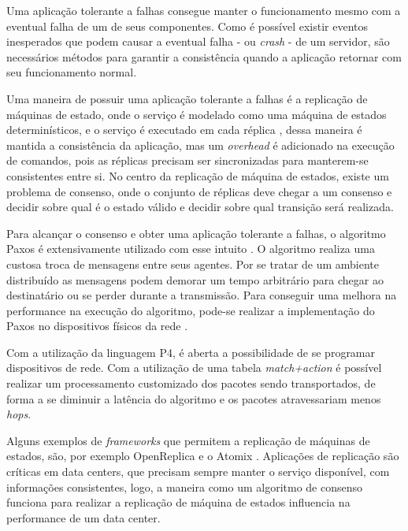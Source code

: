 \documentclass[
    12pt,
    openright, 
    oneside,
    a4paper,
    french,
    english,
    brazil
    ]{facom-ufu-abntex2}
\theoremstyle{definition}
\begin{document}
Uma aplicação tolerante a falhas consegue manter o funcionamento mesmo com a eventual 
falha de um de seus componentes. 
Como é possível existir eventos inesperados que podem causar a eventual falha - ou \emph{crash} - de um servidor, 
são necessários métodos para garantir a consistência quando a aplicação retornar com seu funcionamento normal. 

Uma maneira de possuir uma aplicação tolerante a falhas é a replicação de máquinas de estado, onde o serviço é modelado 
como uma máquina de estados determinísticos, e o serviço é executado em cada réplica \cite{santos2012state}, dessa maneira 
é mantida a consistência da aplicação, mas um \emph{overhead} é adicionado na execução de comandos, pois as réplicas precisam 
ser sincronizadas para manterem-se consistentes entre si. 
No centro da replicação de máquina de estados, existe um problema de consenso, onde o conjunto de réplicas deve chegar a 
um consenso e decidir sobre qual é o estado válido e decidir sobre qual transição será realizada. 

Para alcançar o consenso e obter uma aplicação tolerante a falhas, o algoritmo
Paxos é extensivamente utilizado com esse intuito \cite{dang2016paxos}. 
O algoritmo realiza uma custosa troca de mensagens entre seus agentes. Por se 
tratar de um ambiente distribuído as mensagens podem demorar um tempo arbitrário 
para chegar ao destinatário ou se perder durante a transmissão. Para conseguir 
uma melhora na performance na execução do algoritmo, pode-se realizar a 
implementação do Paxos no dispositivos físicos da rede \cite{dang2016paxos}.

Com a utilização da linguagem P4, é aberta a possibilidade de se programar dispositivos de rede. 
Com a utilização de uma tabela \emph{match+action}  é possível 
realizar um processamento customizado dos pacotes sendo transportados, de forma a se diminuir a latência do algoritmo e os 
pacotes atravessariam menos \emph{hops}.

Alguns exemplos de \emph{frameworks} que permitem a replicação de máquinas de estados, são, por exemplo OpenReplica \cite{openreplica} 
e o Atomix \cite{atomixio}. 
Aplicações de replicação são críticas em data centers, que precisam sempre manter o serviço  disponível, com informações consistentes,
logo, a maneira como um algoritmo de consenso funciona para realizar a replicação de máquina de estados influencia na 
performance de um data center.
\end{document}

